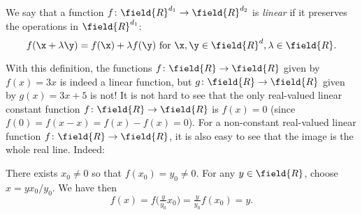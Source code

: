 


\begin{example}\label{example:linearFunction}
We say that a function $f \colon \field{R}^{d_1} \to \field{R}^{d_2}$ is \emph{linear} if it preserves the operations in $\field{R}^{d_1}$: 
\begin{equation*}
f(\x + \lambda \y) = f(\x) + \lambda f(\y) \text{ for }\x, \y \in \field{R}^d, \lambda \in \field{R}.
\end{equation*}

With this definition, the functions $f\colon \field{R} \to \field{R}$ given by $f(x) = 3x$ is indeed a linear function, but $g\colon \field{R} \to \field{R}$ given by $g(x)=3x+5$ is not!  
It is not hard to see that the only real-valued linear constant function $f\colon \field{R} \to \field{R}$ is $f(x) = 0$ (since $f(0)=f(x-x)=f(x)-f(x)=0$).  For a non-constant real-valued linear function $f\colon \field{R} \to \field{R}$, it is also easy to see that the image is the whole real line.  Indeed:

There exists $x_0\neq 0$ so that $f(x_0)=y_0\neq 0$. For any $y \in \field{R}$, choose $x = y x_0/y_0$.  We have then
\begin{equation*}
f(x) = f\big( \tfrac{y}{y_0} x_0 \big) = \tfrac{y}{y_0} f(x_0) = y.
\end{equation*}
\end{example}


